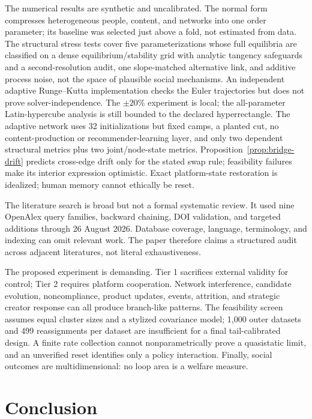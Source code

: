 \documentclass[pdflatex,sn-mathphys-num]{sn-jnl}
\begin{document}
The numerical results are synthetic and uncalibrated. The normal form compresses heterogeneous people, content, and networks into one order parameter; its baseline was selected just above a fold, not estimated from data. The structural stress tests cover five parameterizations whose full equilibria are classified on a dense equilibrium/stability grid with analytic tangency safeguards and a second-resolution audit, one slope-matched alternative link, and additive process noise, not the space of plausible social mechanisms. An independent adaptive Runge--Kutta implementation checks the Euler trajectories but does not prove solver-independence. The $\pm20\%$ experiment is local; the all-parameter Latin-hypercube analysis is still bounded to the declared hyperrectangle. The adaptive network uses 32 initializations but fixed camps, a planted cut, no content-production or recommender-learning layer, and only two dependent structural metrics plus two joint/node-state metrics. Proposition~\ref{prop:bridge-drift} predicts cross-edge drift only for the stated swap rule; feasibility failures make its interior expression optimistic. Exact platform-state restoration is idealized; human memory cannot ethically be reset.

The literature search is broad but not a formal systematic review. It used nine OpenAlex query families, backward chaining, DOI validation, and targeted additions through 26 August 2026. Database coverage, language, terminology, and indexing can omit relevant work. The paper therefore claims a structured audit across adjacent literatures, not literal exhaustiveness.

The proposed experiment is demanding. Tier 1 sacrifices external validity for control; Tier 2 requires platform cooperation. Network interference, candidate evolution, noncompliance, product updates, events, attrition, and strategic creator response can all produce branch-like patterns. The feasibility screen assumes equal cluster sizes and a stylized covariance model; 1,000 outer datasets and 499 reassignments per dataset are insufficient for a final tail-calibrated design. A finite rate collection cannot nonparametrically prove a quasistatic limit, and an unverified reset identifies only a policy interaction. Finally, social outcomes are multidimensional: no loop area is a welfare measure.

\section{Conclusion}
\end{document}
